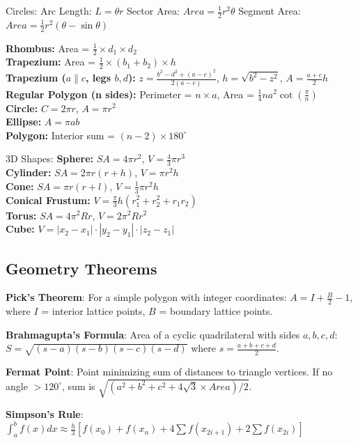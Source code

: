 Circles:
Arc Length: $L = \theta r$
Sector Area: $Area = \frac{1}{2} r^2 \theta$
Segment Area: $Area = \frac{1}{2} r^2 (\theta - \sin\theta)$

\textbf{Rhombus:} Area = $\frac{1}{2} \times d_1 \times d_2$ \\
\textbf{Trapezium:} Area = $\frac{1}{2} \times (b_1 + b_2) \times h$ \\
\textbf{Trapezium ($a \parallel c$, legs $b,d$):} $z = \frac{b^2-d^2+(a-c)^2}{2(a-c)}$, $h = \sqrt{b^2-z^2}$, $A = \frac{a+c}{2}h$ \\
\textbf{Regular Polygon (n sides):} Perimeter = $n \times a$, Area = $\frac{1}{4}na^2 \cot(\frac{\pi}{n})$ \\
\textbf{Circle:} $C = 2\pi r$, $A = \pi r^2$ \\
\textbf{Ellipse:} $A = \pi a b$ \\
\textbf{Polygon:} Interior sum = $(n-2) \times 180^\circ$

3D Shapes:
\textbf{Sphere:} $SA = 4\pi r^2$, $V = \frac{4}{3}\pi r^3$ \\
\textbf{Cylinder:} $SA = 2\pi r(r+h)$, $V = \pi r^2 h$ \\
\textbf{Cone:} $SA = \pi r(r+l)$, $V = \frac{1}{3}\pi r^2 h$ \\
\textbf{Conical Frustum:} $V = \frac{\pi}{3} h (r_1^2 + r_2^2 + r_1 r_2)$ \\
\textbf{Torus:} $SA = 4\pi^2 Rr$, $V = 2\pi^2 Rr^2$ \\
\textbf{Cube:} $V = |x_2-x_1| \cdot |y_2-y_1| \cdot |z_2-z_1|$ \\

\subsection{Geometry Theorems}
\textbf{Pick's Theorem}: For a simple polygon with integer coordinates:
$A = I + \frac{B}{2} - 1$, where $I$ = interior lattice points, $B$ = boundary lattice points.

\textbf{Brahmagupta's Formula}: Area of a cyclic quadrilateral with sides $a,b,c,d$:
$S = \sqrt{(s-a)(s-b)(s-c)(s-d)}$ where $s = \frac{a+b+c+d}{2}$.

\textbf{Fermat Point}: Point minimizing sum of distances to triangle vertices.
If no angle $> 120^\circ$, sum is $\sqrt{(a^2+b^2+c^2 + 4\sqrt{3}\times Area)/2}$.

\textbf{Simpson's Rule}: $\int_a^b f(x) dx \approx \frac{h}{3}[f(x_0) + f(x_n) + 4\sum f(x_{2i+1}) + 2\sum f(x_{2i})]$

